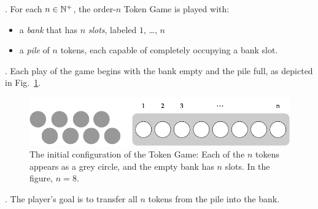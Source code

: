 .
For each $n \in \mathbb{N}^+$, the order-$n$ Token Game is played with:
\begin{itemize}
\item
a {\it bank} that has $n$ {\it slots}, labeled $1$, \ldots, $n$
\medskip\item
a {\it pile} of $n$ tokens, each capable of completely occupying a bank slot.
\end{itemize}

\smallskip

.
Each play of the game begins with the bank empty and the pile full, as depicted in Fig.~\ref{fig:jeujetonsInit}.
\begin{figure}[htb]
\begin{center}
        \includegraphics[scale=0.35]{FiguresMaths/GameTokenInit.png}
\caption{The initial configuration of the Token Game: Each of the $n$ tokens appears as a grey circle, and the empty bank has $n$ slots.  In the figure, $n=8$.}
        \label{fig:jeujetonsInit}
\end{center}
\end{figure}

\medskip

.
The player's goal is to transfer all $n$ tokens from the pile into the bank.

\medskip

